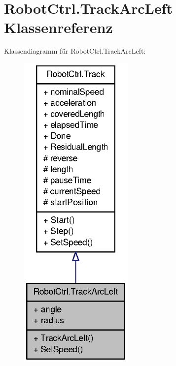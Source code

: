 \hypertarget{class_robot_ctrl_1_1_track_arc_left}{
\section{RobotCtrl.TrackArcLeft Klassenreferenz}
\label{class_robot_ctrl_1_1_track_arc_left}
}


Klassendiagramm für RobotCtrl.TrackArcLeft:\nopagebreak
\begin{figure}[H]
\begin{center}
\leavevmode
\includegraphics[width=158pt]{class_robot_ctrl_1_1_track_arc_left__inherit__graph}
\end{center}
\end{figure}



